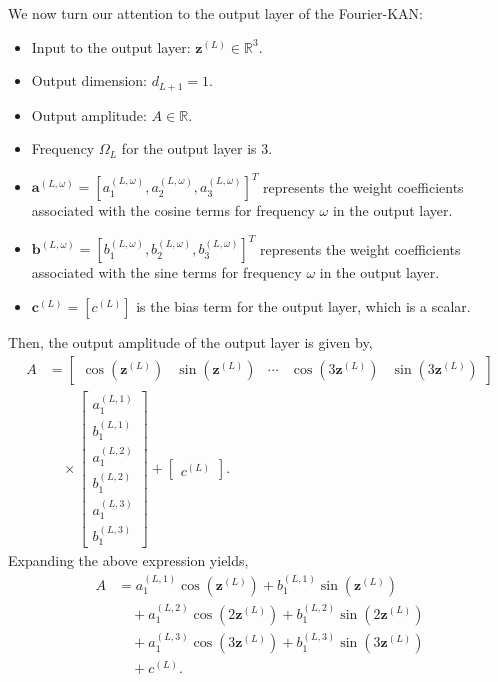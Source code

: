 \documentclass[letterpaper]{article} %
\begin{document}
We now turn our attention to the output layer of the Fourier-KAN:
\begin{itemize}
    \item Input to the output layer: \(\mathbf{z}^{(L)} \in \mathbb{R}^3\).
    \item  Output dimension: \(d_{L+1} = 1\).
    \item  Output amplitude: $A \in \mathbb{R}$.
    \item Frequency \(\Omega_L\) for the output layer is 3.
    \item \(\mathbf{a}^{(L,\omega)} = [a^{(L,\omega)}_1, a^{(L,\omega)}_2, a^{(L,\omega)}_3]^T\) represents the weight coefficients associated with the cosine terms for frequency \(\omega\) in the output layer.
    \item \(\mathbf{b}^{(L,\omega)} = [b^{(L,\omega)}_1, b^{(L,\omega)}_2, b^{(L,\omega)}_3]^T\) represents the weight coefficients associated with the sine terms for frequency \(\omega\) in the output layer.
    \item \(\mathbf{c}^{(L)} = [c^{(L)}]\) is the bias term for the output layer, which is a scalar.
\end{itemize} 
Then, the output amplitude of the output layer is given by,
\begin{equation*}
    \begin{aligned}
        A &= \begin{bmatrix}
        \cos(\mathbf{z}^{(L)}) & \sin(\mathbf{z}^{(L)}) & \cdots & \cos(3\mathbf{z}^{(L)}) & \sin(3\mathbf{z}^{(L)})
        \end{bmatrix} \\
        &\quad \times \begin{bmatrix}
        a^{(L,1)}_1 \\
        b^{(L,1)}_1 \\
        a^{(L,2)}_1 \\
        b^{(L,2)}_1 \\
        a^{(L,3)}_1 \\
        b^{(L,3)}_1
        \end{bmatrix}
        + \begin{bmatrix}
        c^{(L)}
        \end{bmatrix}.
    \end{aligned}
\end{equation*}
Expanding the above expression yields,
\begin{equation}
\label{eq:fourier_out}
\begin{aligned}
    A &= a^{(L,1)}_1 \cos(\mathbf{z}^{(L)}) + b^{(L,1)}_1 \sin(\mathbf{z}^{(L)}) \\
    &\quad + a^{(L,2)}_1 \cos(2\mathbf{z}^{(L)}) + b^{(L,2)}_1 \sin(2\mathbf{z}^{(L)}) \\
    &\quad + a^{(L,3)}_1 \cos(3\mathbf{z}^{(L)}) + b^{(L,3)}_1 \sin(3\mathbf{z}^{(L)}) \\
    &\quad + c^{(L)}.
\end{aligned}
\end{equation}
\end{document}
